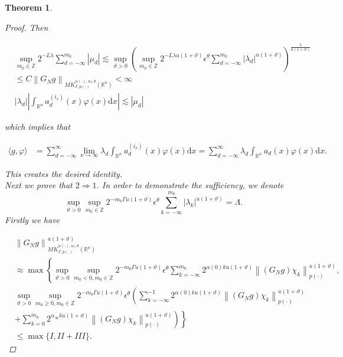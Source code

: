 \documentclass[oneside,reqno]{amsart}
\newtheorem{theorem}{Theorem}[section]
\numberwithin{equation}{section}
\theoremstyle{definition}
\begin{document}
\begin{theorem}
\begin{proof}
Then


\begin{align*}
& \sup _{m_0\in  \mathbb{Z}} 2^{-L \lambda} \sum_{d=-\infty}^{m_0}\left|\mu_{d}\right| \lesssim \sup_{\vartheta>0 }\left(\sup _{m_0\in  \mathbb{Z}} 2^{-L \lambda u(1+\vartheta)}\epsilon  ^\theta \sum_{d=-\infty}^{m_0}\left|\lambda_{d}\right|^{u(1+\vartheta)}\right)^{\frac{1}{u(1+\vartheta)}} \\
& \leq C\left\|G_{N}g \right\|_{{M \dot{K} ^{\alpha(\cdot),u),\theta}_{ \Gamma, p(\cdot)}(\mathbb{R}^n)}}<\infty  \\
&\left|\lambda_{d}\right|\left|\int_{\mathbb{R}^{n}} a_{d}^{\left(i_{v}\right)}(x) \varphi(x) \mathrm{d} x\right| \lesssim\left|\mu_{d}\right|
\end{align*}


which implies that


\begin{align*}
\langle g, \varphi\rangle & =\sum_{d=-\infty}^{\infty} \lim _{\nu \rightarrow \infty} \lambda_{d} \int_{\mathbb{R}^{n}} a_{d}^{\left(i_{\nu}\right)}(x) \varphi(x) \mathrm{d} x  =\sum_{d=-\infty}^{\infty} \lambda_{d} \int_{\mathbb{R}^{n}} a_{d}(x) \varphi(x) \mathrm{d} x . 
\end{align*}


This creates the desired identity.\\
Next we prove that $2 \Rightarrow 1$. 
In order to demonstrate the sufficiency, we denote $$\sup_{\vartheta>0 }\sup \limits _{m_0\in  \mathbb{Z}} 2^{-m_0\Gamma u(1+\vartheta) } \epsilon  ^\theta \sum_{k=-\infty}^{m_0}\left|\lambda_{k}\right|^{u(1+\vartheta)}=\Lambda.$$ Firstly we have


\begin{align*}
& \left\|G_{N}g \right\|_{{M \dot{K} ^{\alpha(\cdot),u),\theta}_{ \Gamma, p(\cdot)}(\mathbb{R}^n)}}^{u(1+\vartheta)} \\
& \approx \max \left\{\sup_{\vartheta>0 }\sup _{m_0<0  , m_0\in  \mathbb{Z}} 2^{-m_0\Gamma u(1+\vartheta)} \epsilon  ^\theta \sum_{k=-\infty}^{m_0} 2^{  \alpha(0) k u(1+\vartheta)}\left\|\left(G_{N}g \right) \chi_{k}\right\|_{{p(\cdot)}}^{u(1+\vartheta)},\right. \\
&  \sup_{\vartheta>0 }\sup _{m_0\geq 0, m_0\in  \mathbb{Z}} 2^{-m_0\Gamma u(1+\vartheta)} \epsilon  ^\theta\left(\sum_{k=-\infty}^{-1} 2^{  \alpha(0) k u(1+\vartheta)}\left\|\left(G_{N}g \right) \chi_{k}\right\|_{{p(\cdot)}}^{u(1+\vartheta)}\right. \\
& \left.\left.+\sum_{k=0}^{m_0} 2^{\alpha_\infty k u(1+\vartheta)}\left\|\left(G_{N}g \right) \chi_{k}\right\|_{{p(\cdot)}}^{u(1+\vartheta)}\right)\right\}\\
&\leq  \max \{I, I I+I I I\}.
\end{align*}






\end{proof}
\end{theorem}
\end{document}
